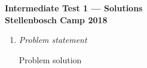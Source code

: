 \documentclass{article}
\begin{document}
\begin{center}
\textbf{\Large Intermediate Test 1 --- Solutions}
\\ \vspace{1em}
\textbf{\large Stellenbosch Camp 2018}
\end{center}

\begin{enumerate}[1.]

\item %
\textit{Problem statement}

Problem solution

\end{enumerate}
\end{document}
